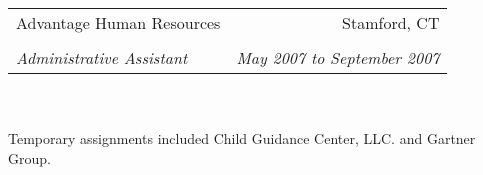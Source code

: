 \documentclass[11pt]{article}
\begin{document}
\noindent
\begin{tabular*}{\textwidth}{@{\extracolsep{\fill}}lr}
\large{Advantage Human Resources} & Stamford, CT\\\\[-0.1in]
\textsl{Administrative Assistant} &
\textsl{\small{May 2007 to September 2007}}\\
\end{tabular*}\\\\
{\small\noindent
Temporary assignments included Child Guidance Center, LLC. and Gartner Group.
}\\\\
\end{document}
